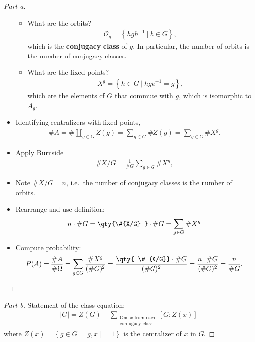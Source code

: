 \begin{solution}
\begin{proof}[Part a]
\begin{itemize}
  \begin{itemize}
  \item
    What are the orbits?
    \begin{align*}
    \mathcal{O}_g = \left\{{hgh^{-1}{~\mathrel{\Big|}~}h\in G}\right\}
    ,\end{align*}
    which is the \textbf{conjugacy class} of \(g\). In particular, the
    number of orbits is the number of conjugacy classes.
  \item
    What are the fixed points?
    \begin{align*}X^g = \left\{{h\in G {~\mathrel{\Big|}~}hgh^{-1}= g}\right\},\end{align*}
    which are the elements of \(G\) that commute with \(g\), which is
    isomorphic to \(A_g\).
  \end{itemize}
\item
  Identifying centralizers with fixed points,
  \begin{align*}
  \#{A} = \#{\displaystyle\coprod_{g\in G} Z(g) } = \sum_{g\in G} \#{Z(g)} = \sum_{g\in G}\# {X^g}
  .\end{align*}
\item
  Apply Burnside
  \begin{align*}
  \# {X / G} = \frac { 1 } { \# G  } \sum _ { g \in G } \# X ^ { g } ,
  \end{align*}
\item
  Note \(\#{X/G} = n\), i.e.~the number of conjugacy classes is the
  number of orbits.
\item
  Rearrange and use definition:
  \begin{align*}
  n \cdot \#{G}
  = \qty{\#{X/G} }\cdot \#{G}
  = \sum _ { g \in G } \# X ^ { g } 
  \end{align*}
\item
  Compute probability:
  \begin{align*}
  P(A)
  = {\# A \over \# \Omega} 
  =  \displaystyle\sum _{ g \in G } \frac{\# X ^ { g }}{ ( \# {G} )^2} 
  = \frac{\qty{ \# {X/G}} \cdot \#{G}}{ (\#{G})^2} 
  = \frac{n \cdot \#{G}}{( \#{G} )^2} 
  = \frac n {\# G}
  .\end{align*}
\end{itemize}

\end{proof}

\begin{proof}[Part b]

Statement of the class equation:
\begin{align*}
{\left\lvert {G} \right\rvert} = Z(G) + \sum_{\substack{\text{One $x$ from each} \\ \text{conjugacy class}}}[G: Z(x)]
\end{align*}
where \(Z(x) = \left\{{g\in G {~\mathrel{\Big|}~}[g, x] = 1}\right\}\)
is the centralizer of \(x\) in \(G\).


\end{proof}
\end{solution}
